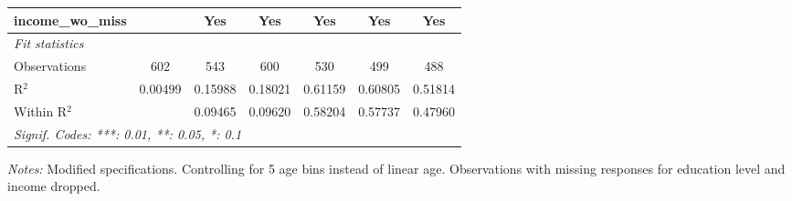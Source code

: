 \begin{tabular}{lcccccc}
   income\_wo\_miss                          &          & Yes           & Yes      & Yes          & Yes          & Yes\\  
   \midrule
   \emph{Fit statistics}\\
   Observations                              & 602      & 543           & 600      & 530          & 499          & 488\\  
   R$^2$                                     & 0.00499  & 0.15988       & 0.18021  & 0.61159      & 0.60805      & 0.51814\\  
   Within R$^2$                              &          & 0.09465       & 0.09620  & 0.58204      & 0.57737      & 0.47960\\  
   \midrule \midrule
   \multicolumn{7}{l}{\emph{Signif. Codes: ***: 0.01, **: 0.05, *: 0.1}}\\
\end{tabular}
 
\par \raggedright 
\textit{Notes:} Modified specifications. Controlling for 5 age bins instead of linear age. Observations with missing responses for education level and income dropped.
\par\endgroup


